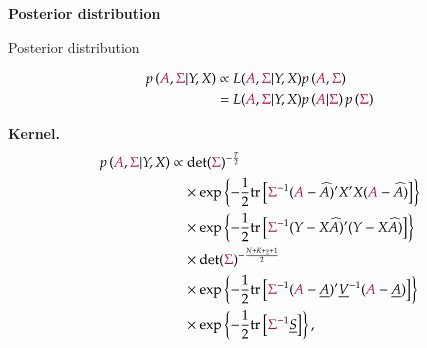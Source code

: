\documentclass[notes,blackandwhite,mathsans,usenames,dvipsnames]{beamer}
\begin{document}
{
\begin{frame}

\begin{adjustwidth}{-0.5cm}{0cm}
\vspace{8.3cm}\Large
\textbf{{\color{mcxs1}Posterior} {\color{mcxs5}distribution}}
\end{adjustwidth}

\end{frame}
}





\begin{frame}{Posterior distribution}

\begin{align*} 
p\left( {\color{purple}A}, {\color{purple}\Sigma}|Y,X \right) &\propto L({\color{purple}A},{\color{purple}\Sigma}|Y,X)p\left( {\color{purple}A}, {\color{purple}\Sigma} \right)\\
&= L({\color{purple}A},{\color{purple}\Sigma}|Y,X)p\left( {\color{purple}A}| {\color{purple}\Sigma} \right)p\left( {\color{purple}\Sigma} \right)
\end{align*} 

\textbf{Kernel.}
\begin{align*} 
p\left( {\color{purple}A},{\color{purple}\Sigma} |Y,X\right) 
&\propto  \text{det}({\color{purple}\Sigma})^{-\frac{T}{2}}\\
&\quad\times\exp\left\{ -\frac{1}{2}\text{tr}\left[ {\color{purple}\Sigma}^{-1}({\color{purple}A}-\widehat{A})'X'X({\color{purple}A}-\widehat{A}) \right] \right\}\\
&\quad\times \exp\left\{ -\frac{1}{2}\text{tr}\left[ {\color{purple}\Sigma}^{-1}(Y-X\widehat{A})'(Y-X\widehat{A}) \right] \right\}\\
& \quad\times\text{det}({\color{purple}\Sigma})^{-\frac{N+K+\underline{\nu}+1}{2}}\\
&\quad\times\exp\left\{ -\frac{1}{2}\text{tr}\left[ {\color{purple}\Sigma}^{-1}({\color{purple}A}-\underline{A})'\underline{V}^{-1}({\color{purple}A}-\underline{A}) \right] \right\}\\
&\quad\times \exp\left\{ -\frac{1}{2}\text{tr}\left[ {\color{purple}\Sigma}^{-1}\underline{S} \right] \right\},
\end{align*} 

\end{frame}
\end{document}
